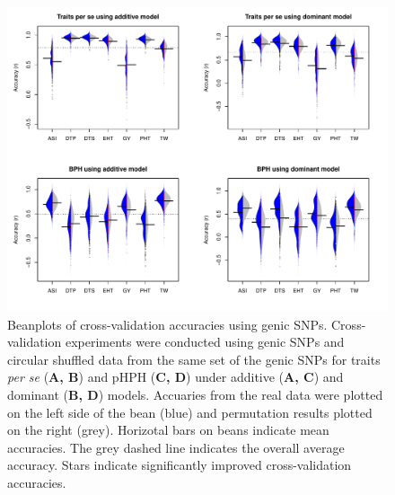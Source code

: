 \documentclass[9pt,twocolumn,twoside]{gsajnl}
\begin{document}
\begin{figure}[htbp]
\centering
\includegraphics[width=\linewidth]{SFig_genicsnp.pdf}
\caption{Beanplots of cross-validation accuracies using genic SNPs. Cross-validation experiments were conducted using genic SNPs and circular shuffled data from the same set of the genic SNPs for traits \emph{per se} (\textbf{A, B}) and pHPH (\textbf{C, D}) under additive (\textbf{A, C}) and dominant (\textbf{B, D}) models. Accuaries from the real data were plotted on the left side of the bean (blue) and permutation results plotted on the right (grey). Horizotal bars on beans indicate mean accuracies. The grey dashed line indicates the overall average accuracy. Stars indicate significantly improved cross-validation accuracies.}
\label{fig:genicsnp}
\end{figure}
\end{document}
